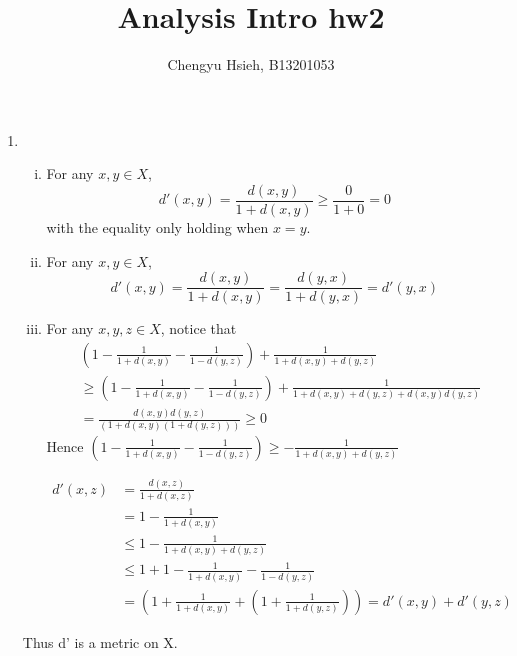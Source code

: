 \documentclass[A4paper,12pt]{article}
\title{Analysis Intro hw2}
\author{Chengyu Hsieh, B13201053}
\date{}
\theoremstyle{definition}
\numberwithin{equation}{section}
\begin{document}
\maketitle

\begin{enumerate}[(1)]
    \item
        \begin{enumerate}[(i)]
            \item
                For any $x, y \in X$, 
                $$
                d'(x,y) = \frac{d(x,y)}{1+d(x,y)} \ge \frac{0}{1+0} = 0
                $$
                with the equality only holding when $x = y$.
            \item
                For any  $x, y \in X$, 
                $$
                d'(x,y) = \frac{d(x,y)}{1+d(x,y)} = \frac{d(y,x)}{1+d(y,x)} = d'(y,x)
                $$
            \item
                For any $x, y, z \in X$, notice that
                \begin{align*}
                &(1-\frac{1}{1+d(x,y)} - \frac{1}{1-d(y,z)}) + \frac{1}{1+d(x,y)+d(y,z)}
                \\&\ge (1-\frac{1}{1+d(x,y)} - \frac{1}{1-d(y,z)}) + \frac{1}{1+d(x,y)+d(y,z)+d(x, y)d(y,z)}                
                \\&= \frac{d(x,y)d(y,z)}{(1+d(x,y)(1+d(y,z)))} \ge 0
                \end{align*}
                Hence $(1-\frac{1}{1+d(x,y)} - \frac{1}{1-d(y,z)}) \ge -\frac{1}{1+d(x,y)+d(y,z)}$

                \begin{align*}
                d'(x,z) &= \frac{d(x,z)}{1+d(x,z)} \\&= 1 - \frac{1}{1+d(x,y)} \\&\leq 1 - \frac{1}{1+d(x,y)+d(y,z)} \\&\leq 1+1-\frac{1}{1+d(x,y)} - \frac{1}{1-d(y,z)} \\&= (1+\frac{1}{1+d(x,y)}+(1+\frac{1}{1+d(y,z)})) = d'(x,y) + d'(y,z)
                \end{align*}
        \end{enumerate}
        Thus d' is a metric on X.


\end{enumerate}
\end{document}
